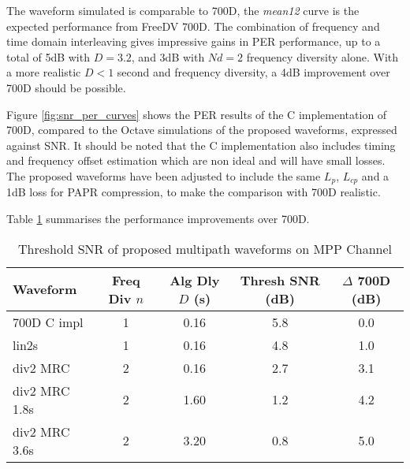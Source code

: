 \documentclass{article}
\begin{document}
The waveform simulated is comparable to 700D, the \emph{mean12} curve is the expected performance from FreeDV 700D.  The combination of frequency and time domain interleaving gives impressive gains in PER performance, up to a total of 5dB with $D=3.2$, and 3dB with $Nd=2$ frequency diversity alone.  With a more realistic $D<1$ second and frequency diversity, a 4dB improvement over 700D should be possible.

Figure \ref{fig:snr_per_curves} shows the PER results of the C implementation of 700D, compared to the Octave simulations of the proposed waveforms, expressed against SNR.  It should be noted that the C implementation also includes timing and frequency offset estimation which are non ideal and will have small losses.  The proposed waveforms have been adjusted to include the same $L_p$, $L_{cp}$ and a 1dB loss for PAPR compression, to make the comparison with 700D realistic.

Table \ref{tab:multipath_thresh_snr} summarises the performance improvements over 700D.

\begin{table}[h]
\centering
\begin{tabular}{l c c c c }
 \hline
 Waveform & Freq Div $n$ & Alg Dly $D$ (s) & Thresh SNR (dB) & $\Delta$ 700D (dB) \\
 \hline
 700D C impl & 1 & 0.16 & 5.8 & 0.0 \\ 
 lin2s  & 1 & 0.16 & 4.8 & 1.0 \\
 div2 MRC & 2 & 0.16 & 2.7 & 3.1 \\ 
 div2 MRC 1.8s & 2 & 1.60 & 1.2 & 4.2 \\ 
 div2 MRC 3.6s & 2 & 3.20 & 0.8 & 5.0 \\ 
 \hline
\end{tabular}
\caption{Threshold SNR of proposed multipath waveforms on MPP Channel}
\label{tab:multipath_thresh_snr}
\end{table}
\end{document}
